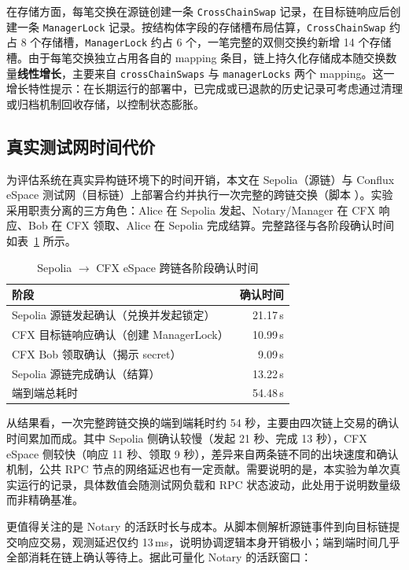 在存储方面，每笔交换在源链创建一条 \texttt{CrossChainSwap} 记录，在目标链响应后创建一条 \texttt{ManagerLock} 记录。按结构体字段的存储槽布局估算，\texttt{CrossChainSwap} 约占 8 个存储槽，\texttt{ManagerLock} 约占 6 个，一笔完整的双侧交换约新增 14 个存储槽。由于每笔交换独立占用各自的 mapping 条目，链上持久化存储成本随交换数量\textbf{线性增长}，主要来自 \texttt{crossChainSwaps} 与 \texttt{managerLocks} 两个 mapping。这一增长特性提示：在长期运行的部署中，已完成或已退款的历史记录可考虑通过清理或归档机制回收存储，以控制状态膨胀。

\subsection{真实测试网时间代价}


为评估系统在真实异构链环境下的时间开销，本文在 Sepolia（源链）与 Conflux eSpace 测试网（目标链）上部署合约并执行一次完整的跨链交换（脚本 ）。实验采用职责分离的三方角色：Alice 在 Sepolia 发起、Notary/Manager 在 CFX 响应、Bob 在 CFX 领取、Alice 在 Sepolia 完成结算。完整路径与各阶段确认时间如表~\ref{tab:timing-cost} 所示。

\begin{table}[htbp]
  \centering
  \caption{Sepolia $\rightarrow$ CFX eSpace 跨链各阶段确认时间}
  \label{tab:timing-cost}
  \begin{tabular}{@{}lr@{}}
    \toprule
    阶段 & 确认时间 \\ \midrule
    Sepolia 源链发起确认（兑换并发起锁定） & 21.17\,s \\
    CFX 目标链响应确认（创建 ManagerLock） & 10.99\,s \\
    CFX Bob 领取确认（揭示 secret） & 9.09\,s \\
    Sepolia 源链完成确认（结算） & 13.22\,s \\ \midrule
    端到端总耗时 & 54.48\,s \\
    \bottomrule
  \end{tabular}
\end{table}

从结果看，一次完整跨链交换的端到端耗时约 54 秒，主要由四次链上交易的确认时间累加而成。其中 Sepolia 侧确认较慢（发起 21 秒、完成 13 秒），CFX eSpace 侧较快（响应 11 秒、领取 9 秒），差异来自两条链不同的出块速度和确认机制，公共 RPC 节点的网络延迟也有一定贡献。需要说明的是，本实验为单次真实运行的记录，具体数值会随测试网负载和 RPC 状态波动，此处用于说明数量级而非精确基准。

更值得关注的是 Notary 的活跃时长与成本。从脚本侧解析源链事件到向目标链提交响应交易，观测延迟仅约 13\,ms，说明协调逻辑本身开销极小；端到端时间几乎全部消耗在链上确认等待上。据此可量化 Notary 的活跃窗口：

